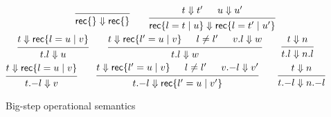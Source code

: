 \begin{figure}
\begin{gather*}
    \qquad
    \begin{prooftree}
      \infer0{\RecordLit \{ \} \Downarrow \RecordLit \{ \}}
    \end{prooftree}
    \qquad
    \begin{prooftree}
      \hypo{t \Downarrow t'}
      \hypo{u \Downarrow u'}
      \infer2{\RecordLit \{ l = t \mid u \}
        \Downarrow \RecordLit \{ l = t' \mid u' \}}
    \end{prooftree}
    \\
    \begin{prooftree}
      \hypo{t \Downarrow \RecordLit \{ l = u \mid v \}}
      \infer1{t.l \Downarrow u}
    \end{prooftree}
    \qquad
    \begin{prooftree}
      \hypo{t \Downarrow \RecordLit \{ l' = u \mid v \}}
      \hypo{l \neq l'}
      \hypo{v.l \Downarrow w}
      \infer3{t.l \Downarrow w}
    \end{prooftree}
    \qquad
    \begin{prooftree}
      \hypo{t \Downarrow n}
      \infer1{t.l \Downarrow n.l}
    \end{prooftree}
    \\
    \begin{prooftree}
      \hypo{t \Downarrow \RecordLit \{ l = u \mid v \}}
      \infer1{t \RecordRestr l \Downarrow v}
    \end{prooftree}
    \qquad
    \begin{prooftree}
      \hypo{t \Downarrow \RecordLit \{ l' = u \mid v \}}
      \hypo{l \neq l'}
      \hypo{v \RecordRestr l \Downarrow v'}
      \infer3{t \RecordRestr l \Downarrow \RecordLit \{ l' = u \mid v' \}}
    \end{prooftree}
    \qquad
    \begin{prooftree}
      \hypo{t \Downarrow n}
      \infer1{t \RecordRestr l \Downarrow n \RecordRestr l}
    \end{prooftree}
  \end{gather*}
  \caption{Big-step operational semantics}\label{fig:big-step}
\end{figure}
